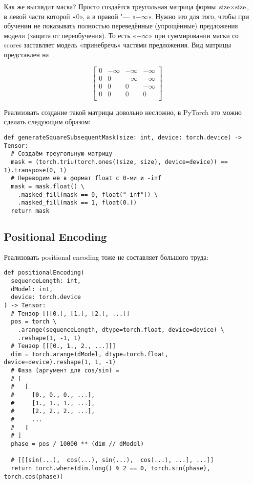 Как же выглядит маска? Просто создаётся треугольная матрица формы $ \text{size} \times \text{size} $, в левой части которой «$0$», а в правой "--- «$-\infty$». Нужно это для того, чтобы при обучении не показывать полностью переведённые (упрощённые) предложения модели (защита от переобучения). То есть «$-\infty$» при суммировании маски со scores заставляет модель «принебречь» частями предложения. Вид матрицы представлен на~.

\begin{equation}\label{mask-matrix}%
  \begin{bmatrix}
    0 & -\infty & -\infty & -\infty \\
    0 & 0 & -\infty & -\infty \\ 
    0 & 0 & 0 & -\infty \\ 
    0 & 0 & 0 & 0 \\ 
  \end{bmatrix}  
\end{equation}

Реализовать создание такой матрицы довольно несложно, в PyTorch это можно сделать следующим образом:

\begin{verbatim}
def generateSquareSubsequentMask(size: int, device: torch.device) -> Tensor:
  # Создаём треугольную матрицу
  mask = (torch.triu(torch.ones((size, size), device=device)) == 1).transpose(0, 1)
  # Переводим её в формат float с 0-ми и -inf
  mask = mask.float() \
    .masked_fill(mask == 0, float("-inf")) \
    .masked_fill(mask == 1, float(0.))
  return mask
\end{verbatim}


\subsection{Positional Encoding}


Реализовать positional encoding тоже не составляет большого труда:

\begin{verbatim}
def positionalEncoding(
  sequenceLength: int,
  dModel: int,
  device: torch.device
) -> Tensor:
  # Тензор [[[0.], [1.], [2.], ...]]
  pos = torch \
    .arange(sequenceLength, dtype=torch.float, device=device) \
    .reshape(1, -1, 1)
  # Тензор [[[0., 1., 2., ...]]]
  dim = torch.arange(dModel, dtype=torch.float, device=device).reshape(1, 1, -1)
  # Фаза (аргумент для cos/sin) =
  # [
  #   [
  #     [0., 0., 0., ...],
  #     [1., 1., 1., ...],
  #     [2., 2., 2., ...],
  #     ...
  #   ]
  # ]
  phase = pos / 10000 ** (dim // dModel)

  # [[[sin(...),  cos(...), sin(...),  cos(...), ...], ...]]
  return torch.where(dim.long() % 2 == 0, torch.sin(phase), torch.cos(phase))
\end{verbatim}


